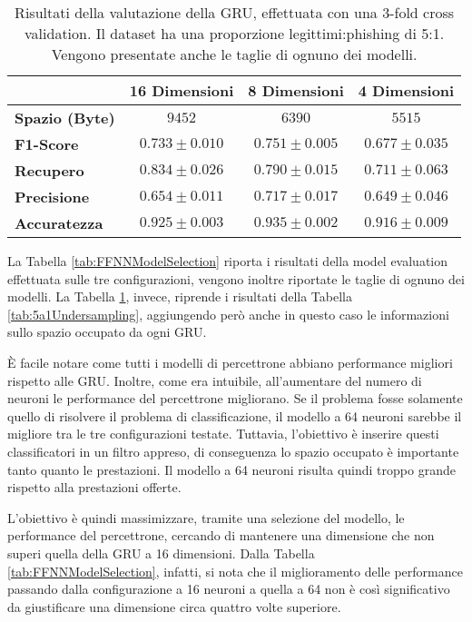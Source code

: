 \documentclass[../../main.tex]{subfiles}
\begin{document}
    \begin{table}[H]
        \centering
        \begin{tabular}{lccc}
            \toprule
            {} &                      \textbf{16 Dimensioni} & \textbf{8 Dimensioni} & \textbf{4 Dimensioni} \\
            \midrule
            \textbf{Spazio (Byte)}  &      $9452$ & $6390$ & $5515$\\
            \midrule               
            \textbf{F1-Score }      &      $0.733 \pm 0.010$ & $0.751 \pm 0.005$ & $0.677 \pm 0.035$\\
            \textbf{Recupero   }    &      $0.834 \pm 0.026$ & $0.790 \pm 0.015$ & $0.711 \pm 0.063$\\
            \textbf{Precisione}     &      $0.654 \pm 0.011$ & $0.717 \pm 0.017$ & $0.649 \pm 0.046$\\
            \textbf{Accuratezza }   &      $0.925 \pm 0.003$ & $0.935 \pm 0.002$ & $0.916 \pm 0.009$\\
            \bottomrule
        \end{tabular}
        \caption{Risultati della valutazione della GRU, effettuata con una 3-fold cross validation. Il dataset ha una proporzione legittimi:phishing di 5:1. Vengono presentate anche le taglie di ognuno dei modelli.}
        \label{tab:GRUModelSelection}
    \end{table}

    La Tabella \ref{tab:FFNNModelSelection} riporta i risultati della model evaluation effettuata sulle tre configurazioni, vengono inoltre riportate le taglie di ognuno dei modelli. La Tabella \ref{tab:GRUModelSelection}, invece, riprende i risultati della Tabella \ref{tab:5a1Undersampling}, aggiungendo però anche in questo caso le informazioni sullo spazio occupato da ogni GRU.

    È facile notare come tutti i modelli di percettrone abbiano performance migliori rispetto alle GRU. Inoltre, come era intuibile, all'aumentare del numero di neuroni le performance del percettrone migliorano. Se il problema fosse solamente quello di risolvere il problema di classificazione, il modello a 64 neuroni sarebbe il migliore tra le tre configurazioni testate. Tuttavia, l'obiettivo è inserire questi classificatori in un filtro appreso, di conseguenza lo spazio occupato è importante tanto quanto le prestazioni. Il modello a 64 neuroni risulta quindi troppo grande rispetto alla prestazioni offerte.
    
    L'obiettivo è quindi massimizzare, tramite una selezione del modello, le performance del percettrone, cercando di mantenere una dimensione che non superi quella della GRU a 16 dimensioni. Dalla Tabella \ref{tab:FFNNModelSelection}, infatti, si nota che il miglioramento delle performance passando dalla configurazione a 16 neuroni a quella a 64 non è così significativo da giustificare una dimensione circa quattro volte superiore.
\end{document}
